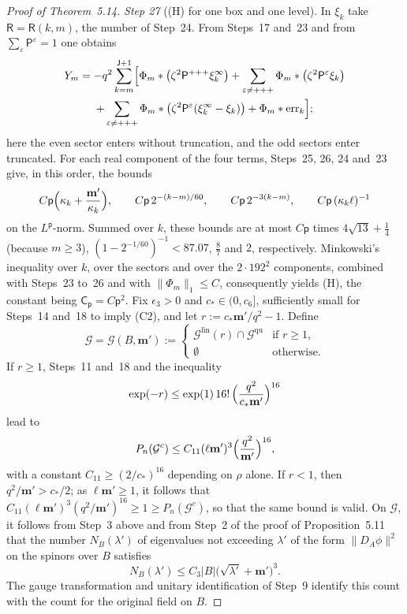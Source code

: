 \documentclass[11pt]{amsart}
\theoremstyle{definition}
\begin{document}
\begin{proof}[Proof of Theorem~5.14]
\emph{Step 27} ((H) for one box and one level).
In $\xi_k$ take $\mathsf R=\mathsf R(k,m)$, the number of Step~24.
From Steps~17 and~23 and from $\sum_\varepsilon\mathsf P^\varepsilon=1$ one obtains
\begin{multline*}
Y_m=-q^2\sum_{k=m}^{\mathsf J+1}\Bigl[\Phi_m*\bigl(\zeta^2\mathsf P^{+++}\xi_k^\infty\bigr)+\sum_{\varepsilon\ne+++}\Phi_m*\bigl(\zeta^2\mathsf P^\varepsilon\xi_k\bigr)\\
+\sum_{\varepsilon\ne+++}\Phi_m*\bigl(\zeta^2\mathsf P^\varepsilon(\xi_k^\infty-\xi_k)\bigr)+\Phi_m*\mathrm{err}_k\Bigr];
\end{multline*}
here the even sector enters without truncation, and the odd sectors enter truncated.
For each real component of the four terms, Steps~25, 26, 24 and~23 give, in this order, the bounds
\begin{equation*}
C\mathsf p\Bigl(\kappa_k+\frac{\mathbf m'}{\kappa_k}\Bigr),\qquad C\mathsf p\,2^{-(k-m)/60},\qquad C\mathsf p\,2^{-3(k-m)},\qquad C\mathsf p\,(\kappa_k\ell)^{-1}
\end{equation*}
on the $L^{\mathsf p}$-norm.
Summed over $k$, these bounds are at most $C\mathsf p$ times $4\sqrt{13}+\frac14$ (because $m\ge3$), $(1-2^{-1/60})^{-1}<87.07$, $\frac87$ and $2$, respectively.
Minkowski's inequality over $k$, over the sectors and over the $2\cdot192^2$ components, combined with Steps~23 to~26 and with $\|\Phi_m\|_1\le C$, consequently yields (H), the constant being $\mathsf C_{\mathsf p}=C\mathsf p^2$.
Fix $\epsilon_3>0$ and $c_*\in(0,c_6]$, sufficiently small for Steps~14 and~18 to imply (C2), and let $r:=c_*\mathbf m'/q^2-1$.
Define
\begin{equation*}
\mathcal G=\mathcal G(B,\mathbf m'):=\begin{cases}\mathcal G^{\mathrm{lin}}(r)\cap\mathcal G^{\mathrm{qu}}&\text{if }r\ge1,\\\emptyset&\text{otherwise.}\end{cases}
\end{equation*}
If $r\ge1$, Steps~11 and~18 and the inequality
\begin{equation*}
\exp(-r)\le\exp(1)\,16!\,\Bigl(\frac{q^2}{c_*\mathbf m'}\Bigr)^{16}
\end{equation*}
lead to
\begin{equation*}
P_n(\mathcal G^c)\le C_{11}(\ell\mathbf m')^3\Bigl(\frac{q^2}{\mathbf m'}\Bigr)^{16},
\end{equation*}
with a constant $C_{11}\ge(2/c_*)^{16}$ depending on $\rho$ alone.
If $r<1$, then $q^2/\mathbf m'>c_*/2$; as $\ell\mathbf m'\ge1$, it follows that $C_{11}(\ell\mathbf m')^3(q^2/\mathbf m')^{16}\ge1\ge P_n(\mathcal G^c)$, so that the same bound is valid.
On $\mathcal G$, it follows from Step~3 above and from Step~2 of the proof of Proposition~5.11 that the number $N_B(\lambda')$ of eigenvalues not exceeding $\lambda'$ of the form $\|D_A\phi\|^2$ on the spinors over $B$ satisfies
\begin{equation*}
N_B(\lambda')\le C_3|B|\bigl(\sqrt{\lambda'}+\mathbf m'\bigr)^3.
\end{equation*}
The gauge transformation and unitary identification of Step~9 identify
this count with the count for the original field on $B$.


\end{proof}
\end{document}
